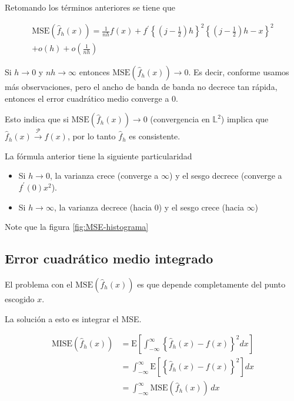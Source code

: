 \documentclass[12pt]{book}\usepackage[]{graphicx}\usepackage[]{color}
\theoremstyle{definition}
\theoremstyle{plain}
\begin{document}
Retomando los términos anteriores se tiene que

\begin{multline*}
	\mathrm{MSE}\left( \hat{f}_h(x)\right) =
	\frac{1}{nh} f(x) + f^\prime
	\left\{
	\left(
	j - \frac{1}{2}
	\right) h
	\right\}^2
	\left\{
	\left(
	j - \frac{1}{2}
	\right) h - x
	\right\}^2 \\
	+ o\left(h \right) + 		o\left(\frac{1}{nh} \right)
\end{multline*}

\begin{nota}{}{}
	Si \(h \to 0\) y \(nh \to \infty\) entonces \(\mathrm{MSE}\left(  \hat{f}_h(x)\right) \to 0 \). Es decir, conforme usamos más observaciones, pero el ancho de banda de banda no decrece tan rápida, entonces el error cuadrático medio converge a 0.

	Esto indica que si \(\mathrm{MSE}\left(  \hat{f}_h(x)\right) \to 0 \) (convergencia en \(\mathbb{L}^2\)) implica que \(\hat{f}_h(x) \stackrel{\mathcal{P}}{\to} f(x)\), por lo tanto \(\hat{f}_h\) es consistente.
\end{nota}

La fórmula anterior tiene la siguiente particularidad

\begin{itemize}
	\item Si \(h\to 0\), la varianza crece (converge a \(\infty\)) y el sesgo decrece (converge a \(f^\prime (0)x^2\)).
	\item Si \(h\to \infty\), la varianza decrece (hacia 0)  y el sesgo crece (hacia \(\infty\))
\end{itemize}

Note que la figura \ref{fig:MSE-histograma}





\subsection{Error cuadrático medio integrado}

El problema con el \(\mathrm{MSE}\left(  \hat{f}_h(x)\right)\) es que depende completamente del punto escogido \(x\).

La solución a esto es integrar el MSE.

\begin{align*}
	\mathrm{MISE}\left(  \hat{f}_h(x)\right)
	  & = \mathrm{E}\left[
		\int_{ -\infty}^{\infty} \left\{
		\hat{f}_h(x) - f(x)
		\right\}^2 dx
		\right]                                                       \\
	  & = \int_{ -\infty}^{\infty} \mathrm{E}\left[
		\left\{
		\hat{f}_h(x) - f(x)
		\right\}^2
		\right] dx                                                    \\
	  & = \int_{ -\infty}^{\infty}\mathrm{MSE}(\hat{f}_h(x)) \, dx
\end{align*}
\end{document}
